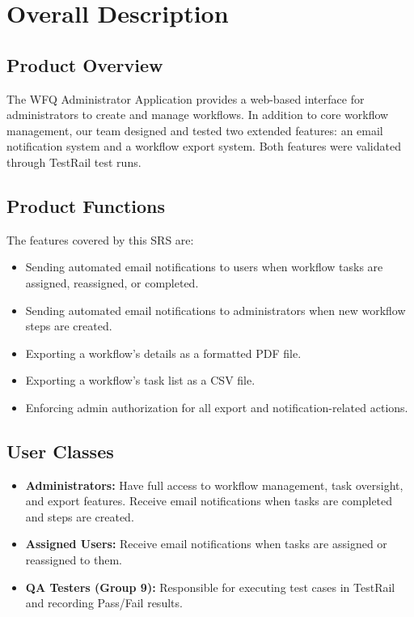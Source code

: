 \documentclass[12pt]{article}
\begin{document}
\section{Overall Description}
 
\subsection{Product Overview}
The WFQ Administrator Application provides a web-based interface for administrators to
create and manage workflows. In addition to core workflow management, our team designed and
tested two extended features: an email notification system and a workflow export system.
Both features were validated through TestRail test runs.
 
\subsection{Product Functions}
The features covered by this SRS are:
 
\begin{itemize}
    \item Sending automated email notifications to users when workflow tasks are assigned,
    reassigned, or completed.
    \item Sending automated email notifications to administrators when new workflow steps
    are created.
    \item Exporting a workflow's details as a formatted PDF file.
    \item Exporting a workflow's task list as a CSV file.
    \item Enforcing admin authorization for all export and notification-related actions.
\end{itemize}
 
\subsection{User Classes}
\begin{itemize}
    \item \textbf{Administrators:} Have full access to workflow management, task oversight,
    and export features. Receive email notifications when tasks are completed and steps are
    created.
    \item \textbf{Assigned Users:} Receive email notifications when tasks are assigned or
    reassigned to them.
    \item \textbf{QA Testers (Group 9):} Responsible for executing test cases in TestRail
    and recording Pass/Fail results.
\end{itemize}
 
\end{document}
